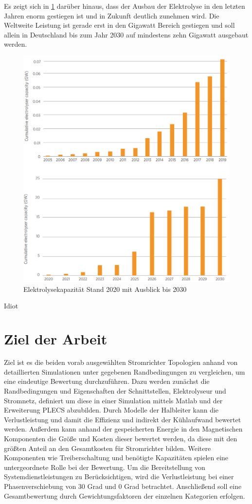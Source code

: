 Es zeigt sich in \ref{fig:elycapacity} darüber hinaus, dass der Ausbau der Elektrolyse in den letzten Jahren enorm gestiegen ist  und in Zukunft deutlich zunehmen wird. Die Weltweite Leistung ist gerade erst in den Gigawatt Bereich gestiegen und soll allein in Deutschland bis zum Jahr 2030 auf mindestens zehn Gigawatt ausgebaut werden.

\begin{figure}
	\centering
	\includegraphics[width=0.7\linewidth]{content/Grafiken/Ely_Capacity}
	\caption[Elektrolyse Kapazität bis 2030]{Elektrolysekapazität Stand 2020 mit Ausblick bis 2030 \cite{IRENA2020}}
	\label{fig:elycapacity}
\end{figure}

Idiot  

\section{Ziel der Arbeit}
Ziel ist es die beiden vorab ausgewählten Stromrichter Topologien anhand von detaillierten Simulationen unter gegebenen Randbedingungen zu vergleichen, um eine eindeutige Bewertung durchzuführen. Dazu werden zunächst die Randbedingungen und Eigenschaften der Schnittstellen, Elektrolyseur und Stromnetz, definiert um diese in einer Simulation mittels Matlab und der Erweiterung PLECS abzubilden. Durch Modelle der Halbleiter kann die Verlustleistung und damit die Effizienz und indirekt der Kühlaufwand bewertet werden. Außerdem kann anhand der gespeicherten Energie in den Magnetischen Komponenten die Größe und Kosten dieser bewertet werden, da diese mit den größten Anteil an den Gesamtkosten für Stromrichter bilden. Weitere Komponenten wie Treiberschaltung und benötigte Kapazitäten spielen eine untergeordnete Rolle bei der Bewertung. Um die Bereitstellung von Systemdienstleistungen zu Berücksichtigen, wird die Verlustleistung bei einer Phasenverschiebung von 30 Grad und 0 Grad betrachtet. Anschließend soll eine Gesamtbewertung durch Gewichtungsfaktoren der einzelnen Kategorien erfolgen.